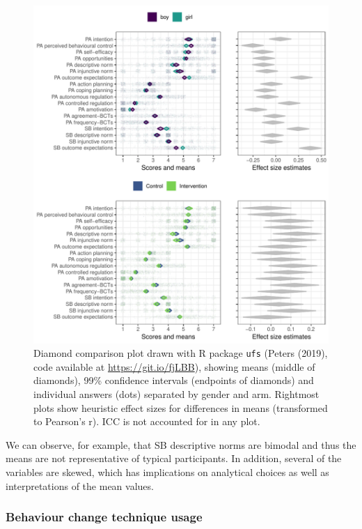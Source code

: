 \documentclass[british,man]{apa6}
\begin{document}
\begin{figure}
\centering
\includegraphics{_baseline-manuscript_files/figure-latex/determinant-diamondplot-manuscript-1.pdf}
\caption{\label{fig:determinant-diamondplot-manuscript}Diamond comparison plot drawn with R package \texttt{ufs} (Peters (2019), code available at \url{https://git.io/fjLBB}), showing means (middle of diamonds), 99\% confidence intervals (endpoints of diamonds) and individual answers (dots) separated by gender and arm. Rightmost plots show heuristic effect sizes for differences in means (transformed to Pearson's r). ICC is not accounted for in any plot.}
\end{figure}

We can observe, for example, that SB descriptive norms are bimodal and thus the means are not representative of typical participants. In addition, several of the variables are skewed, which has implications on analytical choices as well as interpretations of the mean values.

\hypertarget{behaviour-change-technique-usage}{%
\subsubsection{Behaviour change technique usage}\label{behaviour-change-technique-usage}}
\end{document}
